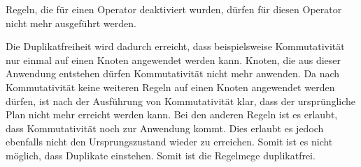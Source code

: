 Regeln, die für einen Operator deaktiviert wurden, dürfen für diesen Operator nicht mehr ausgeführt werden.


Die Duplikatfreiheit wird dadurch erreicht, dass beispielsweise Kommutativität nur einmal auf einen Knoten angewendet werden kann. Knoten, die aus dieser Anwendung entstehen dürfen Kommutativität nicht mehr anwenden. Da nach Kommutativität keine weiteren Regeln auf einen Knoten angewendet werden dürfen, ist nach der Ausführung von Kommutativität klar, dass der ursprüngliche Plan nicht mehr erreicht werden kann. Bei den anderen Regeln ist es erlaubt, dass Kommutativität noch zur Anwendung kommt. Dies erlaubt es jedoch ebenfalls nicht den Ursprungszustand wieder zu erreichen. Somit ist es nicht möglich, dass Duplikate einstehen. Somit ist die Regelmege duplikatfrei.



